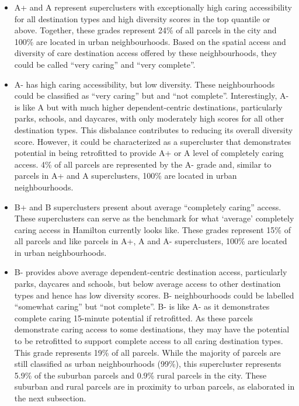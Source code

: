 \documentclass[
  authoryear,
  preprint,
  3p]{elsarticle}
\providecommand{\tightlist}{%
  \setlength{\itemsep}{0pt}\setlength{\parskip}{0pt}}\usepackage{longtable,booktabs,array}
\def\tightlist{}
\begin{document}
\begin{itemize}
\tightlist
\item
  A+ and A represent superclusters with exceptionally high caring
  accessibility for all destination types and high diversity scores in
  the top quantile or above. Together, these grades represent 24\% of
  all parcels in the city and 100\% are located in urban neighbourhoods.
  Based on the spatial access and diversity of care destination access
  offered by these neighbourhoods, they could be called ``very caring''
  and ``very complete''.
\item
  A- has high caring accessibility, but low diversity. These
  neighbourhoods could be classified as ``very caring'' but and ``not
  complete''. Interestingly, A- is like A but with much higher
  dependent-centric destinations, particularly parks, schools, and
  daycares, with only moderately high scores for all other destination
  types. This disbalance contributes to reducing its overall diversity
  score. However, it could be characterized as a supercluster that
  demonstrates potential in being retrofitted to provide A+ or A level
  of completely caring access. 4\% of all parcels are represented by the
  A- grade and, similar to parcels in A+ and A superclusters, 100\% are
  located in urban neighbourhoods.
\item
  B+ and B superclusters present about average ``completely caring''
  access. These superclusters can serve as the benchmark for what
  `average' completely caring access in Hamilton currently looks like.
  These grades represent 15\% of all parcels and like parcels in A+, A
  and A- superclusters, 100\% are located in urban neighbourhoods.
\item
  B- provides above average dependent-centric destination access,
  particularly parks, daycares and schools, but below average access to
  other destination types and hence has low diversity scores. B-
  neighbourhoods could be labelled ``somewhat caring'' but ``not
  complete''. B- is like A- as it demonstrates complete caring 15-minute
  potential if retrofitted. As these parcels demonstrate caring access
  to some destinations, they may have the potential to be retrofitted to
  support complete access to all caring destination types. This grade
  represents 19\% of all parcels. While the majority of parcels are
  still classified as urban neighbourhoods (99\%), this supercluster
  represents 5.9\% of the suburban parcels and 0.9\% rural parcels in
  the city. These suburban and rural parcels are in proximity to urban
  parcels, as elaborated in the next subsection.

\end{itemize}
\end{document}
